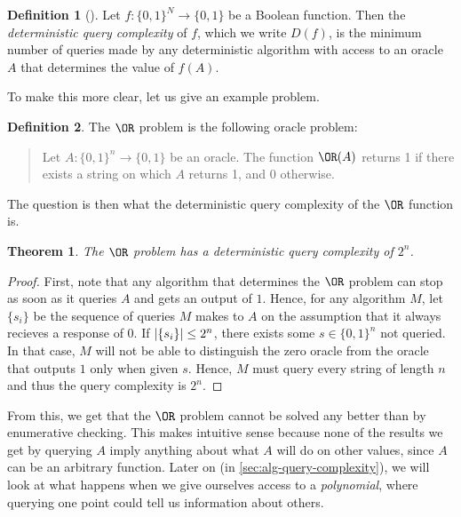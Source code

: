 \documentclass[english,12pt]{reedthesis}
\theoremstyle{plain}
\newtheorem{thm}{Theorem}[section]
\theoremstyle{definition}
\newtheorem{defn}[defn]{Definition}
\theoremstyle{remark}
\DeclarePairedDelimiter{\abs}{\lvert}{\rvert}
\begin{document}
\begin{defn}[{\cite[17]{AW09}}]\label{def:det-qc}
  Let $f\colon \{0, 1\}^{N} \rightarrow \{0, 1\}$ be a Boolean function. Then the
  \emph{deterministic query complexity} of $f$, which we write $D(f)$, is the
  minimum number of queries made by any deterministic algorithm with access to
  an oracle $A$ that determines the value of $f(A)$.
\end{defn}

To make this more clear, let us give an example problem.

\begin{defn}\label{def:or-problem}
  The $\OR$ problem is the following oracle problem:
  \begin{quote}
    Let $A\colon \{0, 1\}^{n} \rightarrow \{0, 1\}$ be an oracle. The function $\OR(A)$
    returns 1 if there exists a string on which $A$ returns 1, and $0$
    otherwise.
  \end{quote}
\end{defn}

The question is then what the deterministic query complexity of the $\OR$
function is.

\begin{thm}
  The $\OR$ problem has a deterministic query complexity of $2^{n}$.
\end{thm}

\begin{proof}
  First, note that any algorithm that determines the $\OR$ problem can stop as
  soon as it queries $A$ and gets an output of $1$. Hence, for any algorithm
  $M$, let $\{s_{i}\}$ be the sequence of queries $M$ makes to $A$ on the
  assumption that it always recieves a response of $0$. If
  $\abs{\{s_{i}\}} \le 2^{n}$, there exists some $s \in \{0, 1\}^{n}$ not queried.
  In that case, $M$ will not be able to distinguish the zero oracle from the
  oracle that outputs $1$ only when given $s$. Hence, $M$ must query every
  string of length $n$ and thus the query complexity is $2^{n}$.
\end{proof}

From this, we get that the $\OR$ problem cannot be solved any better than by
enumerative checking. This makes intuitive sense because none of the results we
get by querying $A$ imply anything about what $A$ will do on other values, since
$A$ can be an arbitrary function. Later on (in \cref{sec:alg-query-complexity}),
we will look at what happens when we give ourselves access to a
\emph{polynomial}, where querying one point could tell us information about
others.
\end{document}
